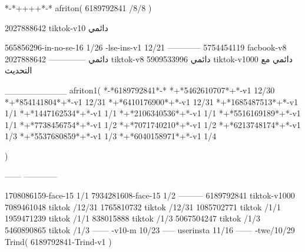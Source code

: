 *-*++++*-*
afriton(
6189792841 /8/8
)

2027888642 tiktok-v10
دائمي

565856296-in-no-se-16 1/26
-lse-ins-v1 12/21
------------
5754454119 facbook-v8
دائمي
--------------
2027888642 tiktok-v8
دائمي
5909533996 tiktok-v1000
دائمي مع التحديث

__________
afriton1(
*-*6189792841*-*
*+*5462610707*+*-v1 12/30
*+*854141804*+*-v1 12/31
*+*6410176900*+*-v1 12/31
*+*1685487513*+*-v1 1/1
*+*1447162534*+*-v1 1/1
*+*2106340536*+*-v1 1/1
*+*5516169189*+*-v1 1/1
*+*7738456754*+*-v1 1/2
*+*7071740210*+*-v1 1/2
*+*6213748174*+*-v1 1/3
*+*5537680859*+*-v1 1/3
*+*6040158971*+*-v1 1/4

)

------
------------

1708086159-face-15 1/1
7934281608-face-15 1/2
---------
6189792841 tiktok-v1000
7089461048 tiktok /12/31
1765810732 tiktok /12/31
1085702771 tiktok /1/1
1959471239 tiktok /1/1
838015888 tiktok /1/3
5067504247 tiktok /1/3
5460890865 tiktok /1/3
------
-v10-m 10/23
-----
userinsta 11/16
------
-twe/10/29
Trind(
6189792841-Trind-v1 
)
